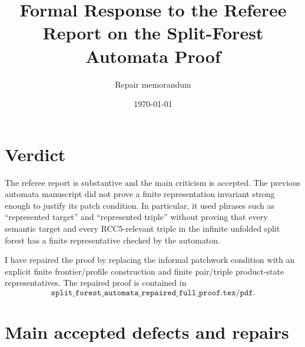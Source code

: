 \documentclass[11pt]{article}
\title{Formal Response to the Referee Report on the Split-Forest Automata Proof}
\author{Repair memorandum}
\date{\today}
\begin{document}
\maketitle

\section*{Verdict}

The referee report is substantive and the main criticism is accepted.  The previous automata manuscript did not prove a finite representation invariant strong enough to justify its patch condition.  In particular, it used phrases such as ``represented target'' and ``represented triple'' without proving that every semantic target and every RCC5-relevant triple in the infinite unfolded split forest has a finite representative checked by the automaton.

I have repaired the proof by replacing the informal patchwork condition with an explicit finite frontier/profile construction and finite pair/triple product-state representatives.  The repaired proof is contained in
\[
\texttt{split\_forest\_automata\_repaired\_full\_proof.tex/pdf}.
\]

\section*{Main accepted defects and repairs}
\end{document}
